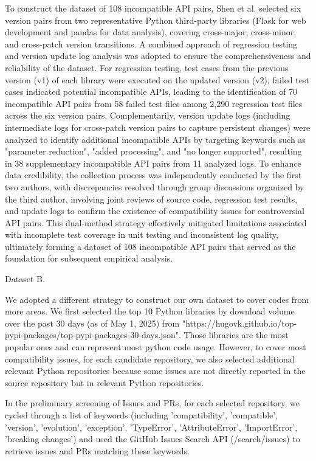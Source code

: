 To construct the dataset of 108 incompatible API pairs, Shen et al. selected six version pairs from two representative Python third-party libraries (Flask for web development and pandas for data analysis), covering cross-major, cross-minor, and cross-patch version transitions. A combined approach of regression testing and version update log analysis was adopted to ensure the comprehensiveness and reliability of the dataset. For regression testing, test cases from the previous version (v1) of each library were executed on the updated version (v2); failed test cases indicated potential incompatible APIs, leading to the identification of 70 incompatible API pairs from 58 failed test files among 2,290 regression test files across the six version pairs. Complementarily, version update logs (including intermediate logs for cross-patch version pairs to capture persistent changes) were analyzed to identify additional incompatible APIs by targeting keywords such as "parameter reduction", "added processing", and "no longer supported", resulting in 38 supplementary incompatible API pairs from 11 analyzed logs. To enhance data credibility, the collection process was independently conducted by the first two authors, with discrepancies resolved through group discussions organized by the third author, involving joint reviews of source code, regression test results, and update logs to confirm the existence of compatibility issues for controversial API pairs. This dual-method strategy effectively mitigated limitations associated with incomplete test coverage in unit testing and inconsistent log quality, ultimately forming a dataset of 108 incompatible API pairs that served as the foundation for subsequent empirical analysis.

Dataset B.

We adopted a different strategy to construct our own dataset to cover codes from more areas. We first selected the top 10 Python libraries by download volume over the past 30 days (as of May 1, 2025) from "https://hugovk.github.io/top-pypi-packages/top-pypi-packages-30-days.json". Those libraries are the most popular ones and can represent most python code usage. However, to cover most compatibility issues, for each candidate repository, we also selected additional relevant Python repositories because some issues are not directly reported in the source repository but in relevant Python repositories.

In the preliminary screening of Issues and PRs, for each selected repository, we cycled through a list of keywords (including 'compatibility', 'compatible', 'version', 'evolution', 'exception', 'TypeError', 'AttributeError', 'ImportError', 'breaking changes') and used the GitHub Issues Search API (/search/issues) to retrieve issues and PRs matching these keywords.

